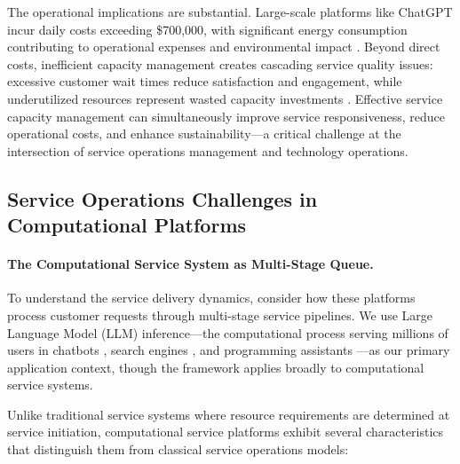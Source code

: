 \documentclass[poms,final,blindrev]{poms1_V1} %
\begin{document}
The operational implications are substantial. Large-scale platforms like ChatGPT incur daily costs exceeding \$700,000, with significant energy consumption contributing to operational expenses and environmental impact \citep{patel2023peeling, patterson2021carbon}. Beyond direct costs, inefficient capacity management creates cascading service quality issues: excessive customer wait times reduce satisfaction and engagement, while underutilized resources represent wasted capacity investments \citep{strubell2019energy, desislavov2021compute}. Effective service capacity management can simultaneously improve service responsiveness, reduce operational costs, and enhance sustainability—a critical challenge at the intersection of service operations management and technology operations.

\subsection{Service Operations Challenges in Computational Platforms}

\paragraph{The Computational Service System as Multi-Stage Queue.}
To understand the service delivery dynamics, consider how these platforms process customer requests through multi-stage service pipelines. We use Large Language Model (LLM) inference—the computational process serving millions of users in chatbots \citep{anthropic2023claude, bai2023qwen, openai2024gpt4technicalreport, deepseekai2025deepseekr1incentivizingreasoningcapability}, search engines \citep{google2023bard, microsoft2023bing}, and programming assistants \citep{copilot, claude_3_7}—as our primary application context, though the framework applies broadly to computational service systems.

Unlike traditional service systems where resource requirements are determined at service initiation, computational service platforms exhibit several characteristics that distinguish them from classical service operations models:
\end{document}
